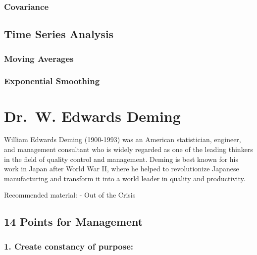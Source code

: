 \documentclass[11pt]{article}
\begin{document}
\hypertarget{covariance}{%
\subsubsection{Covariance}\label{covariance}}

\hypertarget{time-series-analysis}{%
\subsection{Time Series Analysis}\label{time-series-analysis}}

\hypertarget{moving-averages}{%
\subsubsection{Moving Averages}\label{moving-averages}}

\hypertarget{exponential-smoothing}{%
\subsubsection{Exponential Smoothing}\label{exponential-smoothing}}

    

    \hypertarget{dr.-w.-edwards-deming}{%
\section{Dr.~W. Edwards Deming}\label{dr.-w.-edwards-deming}}

    William Edwards Deming (1900-1993) was an American statistician,
engineer, and management consultant who is widely regarded as one of the
leading thinkers in the field of quality control and management. Deming
is best known for his work in Japan after World War II, where he helped
to revolutionize Japanese manufacturing and transform it into a world
leader in quality and productivity.

Recommended material: - Out of the Crisis

\hypertarget{points-for-management}{%
\subsection{14 Points for Management}\label{points-for-management}}

\hypertarget{create-constancy-of-purpose}{%
\subsubsection{1. Create constancy of
purpose:}\label{create-constancy-of-purpose}}
\end{document}

